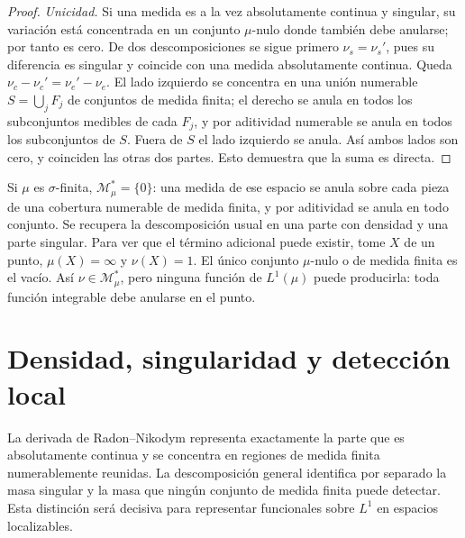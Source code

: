 \begin{proof}
\emph{Unicidad.} Si una medida es a la vez absolutamente continua y singular, su variación está concentrada en un conjunto $\mu$-nulo donde también debe anularse; por tanto es cero. De dos descomposiciones se sigue primero $\nu_s=\nu_s'$, pues su diferencia es singular y coincide con una medida absolutamente continua. Queda $\nu_c-\nu_c'=\nu_e'-\nu_e$. El lado izquierdo se concentra en una unión numerable $S=\bigcup_jF_j$ de conjuntos de medida finita; el derecho se anula en todos los subconjuntos medibles de cada $F_j$, y por aditividad numerable se anula en todos los subconjuntos de $S$. Fuera de $S$ el lado izquierdo se anula. Así ambos lados son cero, y coinciden las otras dos partes. Esto demuestra que la suma es directa.
\end{proof}
\begin{observacion}
Si $\mu$ es $\sigma$-finita, $\mathcal M_\mu^*=\{0\}$: una medida de ese espacio se anula sobre cada pieza de una cobertura numerable de medida finita, y por aditividad se anula en todo conjunto. Se recupera la descomposición usual en una parte con densidad y una parte singular. Para ver que el término adicional puede existir, tome $X$ de un punto, $\mu(X)=\infty$ y $\nu(X)=1$. El único conjunto $\mu$-nulo o de medida finita es el vacío. Así $\nu\in\mathcal M_\mu^*$, pero ninguna función de $L^1(\mu)$ puede producirla: toda función integrable debe anularse en el punto.
\end{observacion}
\section{Densidad, singularidad y detección local}
La derivada de Radon--Nikodym representa exactamente la parte que es absolutamente continua y se concentra en regiones de medida finita numerablemente reunidas. La descomposición general identifica por separado la masa singular y la masa que ningún conjunto de medida finita puede detectar. Esta distinción será decisiva para representar funcionales sobre $L^1$ en espacios localizables.
